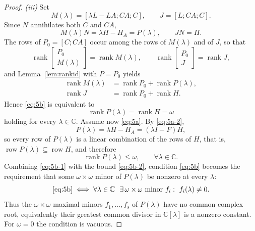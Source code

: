 \begin{proof}
\emph{(iii)} Set
\begin{equation*}
M(\lambda)=[\lambda L-LA;CA;C],\qquad J=[L;CA;C].
\end{equation*}
Since $N$ annihilates both $C$ and $CA$,
\begin{equation*}
M(\lambda)N=\lambda H-H_A=P(\lambda),\qquad JN=H .
\end{equation*}
The rows of $P_0=[C;CA]$ occur among the rows of $M(\lambda)$ and of $J$, so that
\begin{equation*}
\operatorname{rank}\begin{bmatrix}P_0\\ M(\lambda)\end{bmatrix}=\operatorname{rank}M(\lambda),
\qquad
\operatorname{rank}\begin{bmatrix}P_0\\ J\end{bmatrix}=\operatorname{rank}J ,
\end{equation*}
and Lemma~\ref{lem:rankid} with $P=P_0$ yields
\begin{equation*}
\begin{aligned}
\operatorname{rank}M(\lambda)&=\operatorname{rank}P_0+\operatorname{rank}P(\lambda),\\
\operatorname{rank}J&=\operatorname{rank}P_0+\operatorname{rank}H .
\end{aligned}
\end{equation*}
Hence \eqref{eq:5b} is equivalent to
\begin{equation}\label{eq:5b-1}
\operatorname{rank}P(\lambda)=\operatorname{rank}H=\omega
\end{equation}
holding for every $\lambda\in\mathbb C$. Assume now \eqref{eq:5a}. By \eqref{eq:5a-2},
\begin{equation*}
P(\lambda)=\lambda H-H_A=(\lambda I-F)H ,
\end{equation*}
so every row of $P(\lambda)$ is a linear combination of the rows of $H$, that is, $\operatorname{row}P(\lambda)\subseteq\operatorname{row}H$, and therefore
\begin{equation}\label{eq:5b-2}
\operatorname{rank}P(\lambda)\le\omega,\qquad \forall\lambda\in\mathbb C .
\end{equation}
Combining \eqref{eq:5b-1} with the bound \eqref{eq:5b-2}, condition \eqref{eq:5b} becomes the requirement that some $\omega\times\omega$ minor of $P(\lambda)$ be nonzero at every $\lambda$:
\begin{equation*}
\eqref{eq:5b}
\iff
\forall\lambda\in\mathbb C\ \ \exists\,\omega\times\omega\text{ minor } f_i:\ f_i(\lambda)\neq0 .
\end{equation*}
Thus the $\omega\times\omega$ maximal minors $f_1,\dots,f_s$ of $P(\lambda)$ have no common complex root, equivalently their greatest common divisor in $\mathbb C[\lambda]$ is a nonzero constant. For $\omega=0$ the condition is vacuous.


\end{proof}
